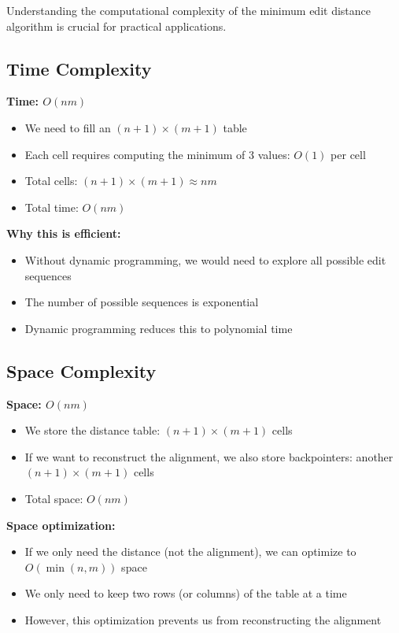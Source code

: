 \documentclass[11pt,a4paper]{article}
\theoremstyle{definition}
\theoremstyle{plain}
\theoremstyle{remark}
\begin{document}
Understanding the computational complexity of the minimum edit distance algorithm is crucial for practical applications.

\subsection{Time Complexity}

\textbf{Time: $O(nm)$}

\begin{itemize}
    \item We need to fill an $(n+1) \times (m+1)$ table
    \item Each cell requires computing the minimum of 3 values: $O(1)$ per cell
    \item Total cells: $(n+1) \times (m+1) \approx nm$
    \item Total time: $O(nm)$
\end{itemize}

\textbf{Why this is efficient:}
\begin{itemize}
    \item Without dynamic programming, we would need to explore all possible edit sequences
    \item The number of possible sequences is exponential
    \item Dynamic programming reduces this to polynomial time
\end{itemize}

\subsection{Space Complexity}

\textbf{Space: $O(nm)$}

\begin{itemize}
    \item We store the distance table: $(n+1) \times (m+1)$ cells
    \item If we want to reconstruct the alignment, we also store backpointers: another $(n+1) \times (m+1)$ cells
    \item Total space: $O(nm)$
\end{itemize}

\textbf{Space optimization:}
\begin{itemize}
    \item If we only need the distance (not the alignment), we can optimize to $O(\min(n,m))$ space
    \item We only need to keep two rows (or columns) of the table at a time
    \item However, this optimization prevents us from reconstructing the alignment
\end{itemize}
\end{document}
